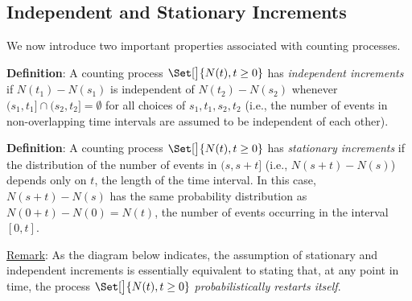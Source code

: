 \subsection*{Independent and Stationary Increments}
We now introduce two important properties associated with counting processes.
\begin{Regular}
    \textbf{Definition}: A counting process $ \Set[\big]{N(t),t\ge 0} $ has \emph{independent increments} if $ N(t_1)-N(s_1) $ is
    independent of $ N(t_2)-N(s_2) $ whenever $ (s_1,t_1]\cap (s_2,t_2]=\emptyset $ for all choices of $ s_1,t_1,s_2,t_2 $
    (i.e., the number of events in non-overlapping time intervals are assumed to be independent of each other).
\end{Regular}
\begin{Regular}
    \textbf{Definition}: A counting process $ \Set[\big]{N(t),t\ge 0} $ has \emph{stationary increments} if the distribution
    of the number of events in $ (s,s+t] $ (i.e., $ N(s+t)-N(s) $) depends only on $ t $, the length of the time interval.
    In this case, $ N(s+t)-N(s) $ has the same probability distribution as $ N(0+t)-N(0)=N(t) $, the number of events
    occurring in the interval $ [0,t] $.
\end{Regular}
\underline{Remark}: As the diagram below indicates, the assumption of stationary and independent
increments is essentially equivalent to stating that, at any point in time, the process
$ \Set[\big]{N(t),t\ge 0} $ \emph{probabilistically restarts itself}.
\begin{figure}[!htbp]
    \centering
\end{figure}
